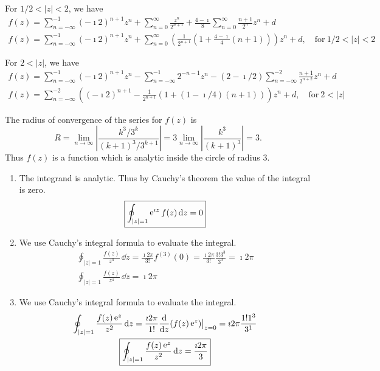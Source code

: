 {\begin{Solution}
  For $1/2 < |z| < 2$, we have
  \begin{gather*}
    f(z) = \sum_{n = -\infty}^{-1} (- \imath 2)^{n+1} z^n + \sum_{n = 0}^\infty \frac{z^n}{2^{n+1}}
    + \frac{4 - \imath}{8} \sum_{n = 0}^\infty \frac{n + 1}{2^n} z^n + d 
    \\
    \boxed{
      f(z) = \sum_{n = -\infty}^{-1} (- \imath 2)^{n+1} z^n
      + \sum_{n = 0}^\infty \left( \frac{1}{2^{n+1}} \left( 1 
          + \frac{4 - \imath}{4} (n + 1) \right) \right) z^n
      + d, \quad \mathrm{for}\ 1/2 < |z| < 2
      }
  \end{gather*}

  For $2 < |z|$, we have
  \begin{gather*}
    f(z) = \sum_{n = -\infty}^{-1} (- \imath 2)^{n+1} z^n
    - \sum_{n = -\infty}^{-1} 2^{-n - 1} z^n
    - ( 2 - \imath / 2 ) \sum_{n = -\infty}^{-2} \frac{n + 1}{2^{n+2}} z^n
    + d 
    \\
    \boxed{
      f(z) = \sum_{n = -\infty}^{-2} \left( (- \imath 2)^{n+1}
        - \frac{1}{2^{n+1}} \left( 1 + ( 1 - \imath / 4 ) (n + 1) \right) \right) z^n
      + d, \quad \mathrm{for}\ 2 < |z| 
      }
  \end{gather*}
\end{Solution}


\begin{Solution}
  \label{solution sum k^3 (z/3)^k}
  The radius of convergence of the series for $f(z)$ is
  \[
  R = \lim_{n \to \infty} \left| \frac{k^3 / 3^k}{(k + 1)^3 / 3^{k+1} } \right|
  = 3 \lim_{n \to \infty} \left| \frac{k^3}{(k + 1)^3} \right|
  = 3.
  \]
  Thus $f(z)$ is a function which is analytic inside the circle of radius 3.

  \begin{enumerate}
  \item
    The integrand is analytic.  Thus by Cauchy's theorem the value of the 
    integral is zero.
    \[
    \boxed{
      \oint_{|z| = 1} \mathop{\mathrm{e}}\nolimits^{\imath z} f(z) \,\mathrm{d} z = 0
      }
    \]
  \item
    We use Cauchy's integral formula to evaluate the integral.
    \begin{gather*}
      \oint_{|z| = 1} \frac{f(z)}{z^4}\,\dd z = \frac{\imath 2 \pi}{3!} f^{(3)}(0) 
      = \frac{\imath 2 \pi}{3!} \frac{3! 3^3}{3^3} = \imath 2 \pi 
      \\
      \boxed{
        \oint_{|z| = 1} \frac{f(z)}{z^4}\,\dd z = \imath 2 \pi
        }
    \end{gather*}
  \item
    We use Cauchy's integral formula to evaluate the integral.
    \begin{gather*}
      \oint_{|z| = 1} \frac{f(z) \mathop{\mathrm{e}}\nolimits^z}{z^2}\,\mathrm{d} z 
      = \frac{\imath 2 \pi}{1!} \frac{\mathrm{d}}{\mathrm{d} z}(f(z) \mathop{\mathrm{e}}\nolimits^z) \big|_{z = 0}
      = \imath 2 \pi \frac{1! 1^3}{3^1} 
      \\
      \boxed{
        \oint_{|z| = 1} \frac{f(z) \mathop{\mathrm{e}}\nolimits^z}{z^2}\,\mathrm{d} z = \frac{\imath 2 \pi}{3}
        }
    \end{gather*}
  \end{enumerate}
\end{Solution}


}
